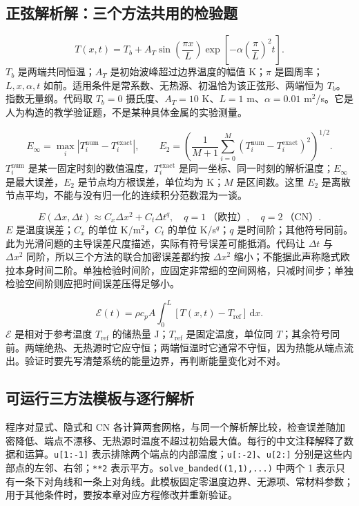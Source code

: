 \documentclass[UTF8,zihao=-4,openany,oneside,fontset=windows]{ctexbook}
\begin{document}
\subsection{正弦解析解：三个方法共用的检验题}
\begin{equation}
T(x,t)=T_b+A_T\sin\left(\frac{\pi x}{L}\right)
\exp\left[-\alpha\left(\frac{\pi}{L}\right)^2t\right].
\end{equation}
$T_b$ 是两端共同恒温；$A_T$ 是初始波峰超过边界温度的幅值 K；$\pi$ 是圆周率；$L,x,\alpha,t$ 如前。适用条件是常系数、无热源、初温恰为该正弦形、两端恒为 $T_b$。指数无量纲。代码取 $T_b=0$ 摄氏度、$A_T=10$ K、$L=1$ m、$\alpha=0.01$ m$^2$/s。它是人为构造的教学验证题，不是某种具体金属的实验测量。

\begin{equation}
E_\infty=\max_i|T_i^{\mathrm{num}}-T_i^{\mathrm{exact}}|,\qquad
E_2=\left(\frac{1}{M+1}\sum_{i=0}^M(T_i^{\mathrm{num}}-T_i^{\mathrm{exact}})^2\right)^{1/2}.
\end{equation}
$T_i^{\mathrm{num}}$ 是某一固定时刻的数值温度，$T_i^{\mathrm{exact}}$ 是同一坐标、同一时刻的解析温度；$E_\infty$ 是最大误差，$E_2$ 是节点均方根误差，单位均为 K；$M$ 是区间数。这里 $E_2$ 是离散节点平均，不能与没有归一化的连续积分范数混为一谈。

\begin{equation}
E(\Delta x,\Delta t)\approx C_x\Delta x^2+C_t\Delta t^q,
\quad q=1\ \text{（欧拉）},\quad q=2\ \text{（CN）}.
\end{equation}
$E$ 是温度误差；$C_x$ 的单位 K/m$^2$，$C_t$ 的单位 K/s$^q$；$q$ 是时间阶；其他符号同前。此为光滑问题的主导误差尺度描述，实际有符号误差可能抵消。代码让 $\Delta t$ 与 $\Delta x^2$ 同阶，所以三个方法的联合加密误差都约按 $\Delta x^2$ 缩小；不能据此声称隐式欧拉本身时间二阶。单独检验时间阶，应固定非常细的空间网格，只减时间步；单独检验空间阶则应把时间误差压得足够小。

\begin{equation}
\mathcal E(t)=\rho c_pA\int_0^L[T(x,t)-T_{\mathrm{ref}}]\,\mathrm dx.
\end{equation}
$\mathcal E$ 是相对于参考温度 $T_{\mathrm{ref}}$ 的储热量 J；$T_{\mathrm{ref}}$ 是固定温度，单位同 $T$；其余符号同前。两端绝热、无热源时它应守恒；两端恒温时它通常不守恒，因为热能从端点流出。验证时要先写清楚系统的能量边界，再判断能量变化对不对。

\subsection{可运行三方法模板与逐行解析}
程序对显式、隐式和 CN 各计算两套网格，与同一个解析解比较，检查误差随加密降低、端点不漂移、无热源时温度不超过初始最大值。每行的中文注释解释了数据和运算。\texttt{u[1:-1]} 表示排除两个端点的内部温度；\texttt{u[:-2]}、\texttt{u[2:]} 分别是这些内部点的左邻、右邻；\texttt{**2} 表示平方。\texttt{solve\_banded((1,1),...)} 中两个 1 表示只有一条下对角线和一条上对角线。此模板固定零温度边界、无源项、常材料参数；用于其他条件时，要按本章对应方程修改并重新验证。
\end{document}
